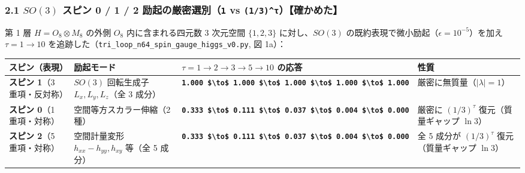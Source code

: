\documentclass[
  a4paper,
]{ltjsarticle}
\newcounter{none} %
\begin{document}
\subsubsection{\texorpdfstring{2.1 \(SO(3)\) スピン 0 / 1 / 2
励起の厳密選別（\texttt{1} vs
\texttt{(1/3)\^{}τ}）【確かめた】}{2.1 SO(3) スピン 0 / 1 / 2 励起の厳密選別（1 vs (1/3)\^{}τ）【確かめた】}}\label{so3-ux30b9ux30d4ux30f3-0-1-2-ux52b1ux8d77ux306eux53b3ux5bc6ux9078ux52251-vs-13ux3c4ux78baux304bux3081ux305f}

第 1 層 \(H = O_8 \otimes M_8\) の外側 \(O_8\) 内に含まれる四元数 3
次元空間 \(\{1, 2, 3\}\) に対し、\(SO(3)\)
の既約表現で微小励起（\(\epsilon = 10^{-5}\)）を加え \(\tau = 1 \to 10\)
を追跡した（\texttt{tri\_\allowbreak{}loop\_\allowbreak{}n64\_\allowbreak{}spin\_\allowbreak{}gauge\_\allowbreak{}higgs\_\allowbreak{}v0.py}, 図
1a）：

{\def\LTcaptype{none} %
\begin{longtable}[]{@{}
  >{\raggedright\arraybackslash}p{}
  >{\raggedright\arraybackslash}p{}
  >{\raggedright\arraybackslash}p{}
  >{\raggedright\arraybackslash}p{}@{}}
\toprule\noalign{}
\begin{minipage}[b]{\linewidth}\raggedright
スピン（表現）
\end{minipage} & \begin{minipage}[b]{\linewidth}\raggedright
励起モード
\end{minipage} & \begin{minipage}[b]{\linewidth}\raggedright
\(\tau = 1 \to 2 \to 3 \to 5 \to 10\) の応答
\end{minipage} & \begin{minipage}[b]{\linewidth}\raggedright
性質
\end{minipage} \\
\midrule\noalign{}
\endhead
\bottomrule\noalign{}
\endlastfoot
\textbf{スピン 1}（3 重項・反対称） & \(SO(3)\) 回転生成子
\(L_x, L_y, L_z\)（全 3 成分） &
\textbf{\texttt{1.000\ \$\textbackslash{}to\$\ 1.000\ \$\textbackslash{}to\$\ 1.000\ \$\textbackslash{}to\$\ 1.000\ \$\textbackslash{}to\$\ 1.000}}
& 厳密に無質量（\(|\lambda|=1\)） \\
\textbf{スピン 0}（1 重項・対称） & 3 空間等方スカラー伸縮（2 種） &
\textbf{\texttt{0.333\ \$\textbackslash{}to\$\ 0.111\ \$\textbackslash{}to\$\ 0.037\ \$\textbackslash{}to\$\ 0.004\ \$\textbackslash{}to\$\ 0.000}}
& 厳密に \((1/3)^\tau\) 復元（質量ギャップ \(\ln 3\)） \\
\textbf{スピン 2}（5 重項・対称） & 3 空間計量変形
\(h_{xx}-h_{yy}, h_{xy}\) 等（全 5 成分） &
\textbf{\texttt{0.333\ \$\textbackslash{}to\$\ 0.111\ \$\textbackslash{}to\$\ 0.037\ \$\textbackslash{}to\$\ 0.004\ \$\textbackslash{}to\$\ 0.000}}
& 全 5 成分が \((1/3)^\tau\) 復元（質量ギャップ \(\ln 3\)） \\
\end{longtable}
}
\end{document}
